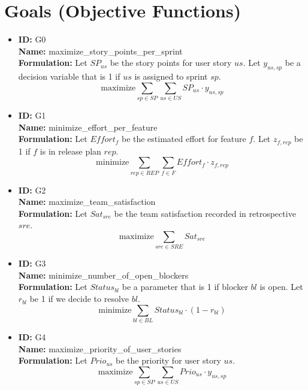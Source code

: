 \documentclass[11pt]{article}
\begin{document}
\section{Goals (Objective Functions)}
\begin{itemize}
    \item \textbf{ID:} G0 \\ \textbf{Name:} maximize\_story\_points\_per\_sprint \\
    \textbf{Formulation:} Let $SP_{us}$ be the story points for user story $us$. Let $y_{us,sp}$ be a decision variable that is 1 if $us$ is assigned to sprint $sp$.
    $$ \text{maximize} \sum_{sp \in SP} \sum_{us \in US} SP_{us} \cdot y_{us,sp} $$

    \item \textbf{ID:} G1 \\ \textbf{Name:} minimize\_effort\_per\_feature \\
    \textbf{Formulation:} Let $Effort_f$ be the estimated effort for feature $f$. Let $z_{f,rep}$ be 1 if $f$ is in release plan $rep$.
    $$ \text{minimize} \sum_{rep \in REP} \sum_{f \in F} Effort_f \cdot z_{f,rep} $$

    \item \textbf{ID:} G2 \\ \textbf{Name:} maximize\_team\_satisfaction \\
    \textbf{Formulation:} Let $Sat_{sre}$ be the team satisfaction recorded in retrospective $sre$.
    $$ \text{maximize} \sum_{sre \in SRE} Sat_{sre} $$

    \item \textbf{ID:} G3 \\ \textbf{Name:} minimize\_number\_of\_open\_blockers \\
    \textbf{Formulation:} Let $Status_{bl}$ be a parameter that is 1 if blocker $bl$ is open. Let $r_{bl}$ be 1 if we decide to resolve $bl$.
    $$ \text{minimize} \sum_{bl \in BL} Status_{bl} \cdot (1 - r_{bl}) $$
    
    \item \textbf{ID:} G4 \\ \textbf{Name:} maximize\_priority\_of\_user\_stories \\
    \textbf{Formulation:} Let $Prio_{us}$ be the priority for user story $us$.
    $$ \text{maximize} \sum_{sp \in SP} \sum_{us \in US} Prio_{us} \cdot y_{us,sp} $$
\end{itemize}

\end{document}
